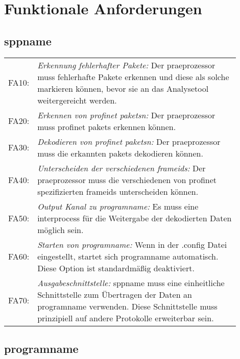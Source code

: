 \chapter{Funktionale Anforderungen}

\renewcommand{\arraystretch}{2}
\section{\gls{sppname}}
\begin{tabular}{lp{0.9\linewidth}}

FA10: & \textit{Erkennung fehlerhafter Pakete: }Der \gls{praeprozessor} muss fehlerhafte Pakete erkennen und diese als solche markieren können, bevor sie an das Analysetool weitergereicht werden. \\

FA20: & \textit{Erkennen von \gls{profinet} \glspl{paket}n: }Der \gls{praeprozessor} muss \gls{profinet} \glspl{paket} erkennen können. \\

FA30: & \textit{Dekodieren von \gls{profinet} \glspl{paket}n: }Der \gls{praeprozessor} muss die erkannten \glspl{paket} dekodieren können. \\

FA40: & \textit{Unterscheiden der verschiedenen \gls{frameid}s: }Der \gls{praeprozessor} muss die verschiedenen von \gls{profinet} spezifizierten \gls{frameid}s unterscheiden können.\\

FA50: & \textit{Output Kanal zu \gls{programname}: }Es muss eine \gls{interprocess} für die Weitergabe der dekodierten Daten möglich sein.\\

FA60: & \textit{Starten von \gls{programname}: }Wenn in der .config Datei eingestellt, startet sich \gls{programname} automatisch. Diese Option ist standardmäßig deaktiviert.\\

FA70: & \textit{Ausgabeschnittstelle: }\gls{sppname} muss eine einheitliche Schnittstelle zum Übertragen der Daten an \gls{programname} verwenden. Diese Schnittstelle muss prinzipiell auf andere Protokolle erweiterbar sein.\\

\end{tabular}

\section{\gls{programname}}
